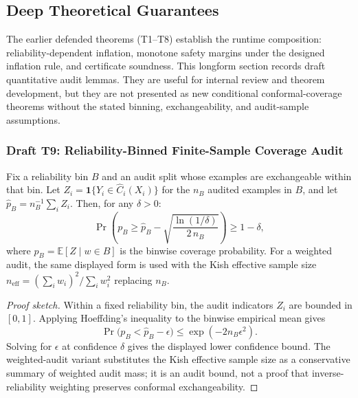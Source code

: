 
\subsection{Deep Theoretical Guarantees}\label{sec:deep_guarantees}

The earlier defended theorems (T1--T8) establish the runtime composition:
reliability-dependent inflation, monotone safety margins under the designed
inflation rule, and certificate soundness.  This longform section records draft
quantitative audit lemmas.  They are useful for internal review and theorem
development, but they are not presented as new conditional conformal-coverage
theorems without the stated binning, exchangeability, and audit-sample
assumptions.

\subsubsection{Draft T9: Reliability-Binned Finite-Sample Coverage Audit}

\begin{theorem}\label{thm:deep-finite-sample}
Fix a reliability bin $B$ and an audit split whose examples are exchangeable
within that bin.  Let
$Z_i=\mathbf{1}\{Y_i\in \hat C_i(X_i)\}$ for the $n_B$ audited examples in
$B$, and let $\widehat p_B=n_B^{-1}\sum_i Z_i$.  Then, for any
$\delta>0$:
\[
  \Pr\left(
    p_B \ge \widehat p_B -
    \sqrt{\frac{\ln(1/\delta)}{2\,n_B}}
  \right) \ge 1-\delta,
\]
where $p_B=\mathbb{E}[Z\mid w\in B]$ is the binwise coverage probability.  For
a weighted audit, the same displayed form is used with the Kish effective
sample size $n_{\mathrm{eff}}=(\sum_i w_i)^2/\sum_i w_i^2$ replacing $n_B$.
\end{theorem}

\begin{proof}[Proof sketch]
Within a fixed reliability bin, the audit indicators $Z_i$ are bounded in
$[0,1]$.  Applying Hoeffding's inequality to the binwise empirical mean gives
\[
  \Pr\bigl(p_B < \widehat p_B-\epsilon\bigr)
  \le \exp(-2n_B\epsilon^2).
\]
Solving for $\epsilon$ at confidence $\delta$ gives the displayed lower
confidence bound.  The weighted-audit variant substitutes the Kish effective
sample size as a conservative summary of weighted audit mass; it is an audit
bound, not a proof that inverse-reliability weighting preserves conformal
exchangeability.
\end{proof}


